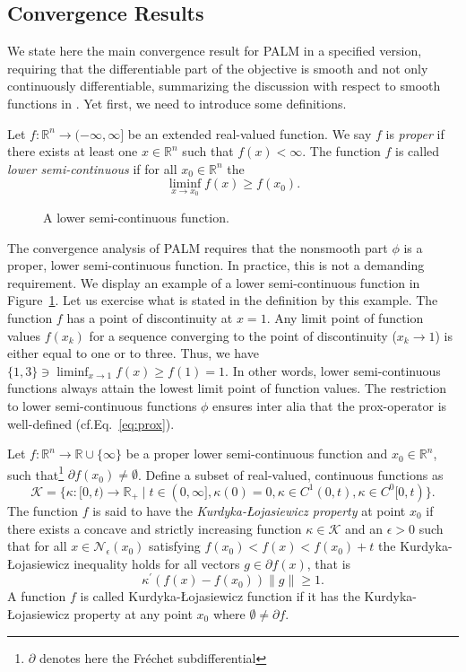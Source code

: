 \subsection{Convergence Results}
We state here the main convergence result for PALM in a specified version, requiring that the differentiable part of the objective is smooth and not only continuously differentiable, summarizing the discussion with respect to smooth functions in \citep{bolte2014proximal}. Yet first, we need to introduce some definitions.
\begin{definition} Let $f:\mathbb{R}^{n}\rightarrow (-\infty,\infty]$ be an extended real-valued function. We say $f$ is \emph{proper} if there exists at least one $x\in\mathbb{R}^n$ such that $f(x)<\infty$. The function $f$ is called \emph{lower semi-continuous} if for all $x_0\in\mathbb{R}^n$ the
\[\liminf_{x\rightarrow x_0}f(x)\geq f(x_0).\]
\end{definition}
\begin{figure}
\centering

\caption{A lower semi-continuous function.}
\label{fig:PT:lowerSemiCont}
\end{figure}
The convergence analysis of PALM requires that the nonsmooth part $\phi$ is a proper, lower semi-continuous function. In practice, this is not a demanding requirement.
We display an example of a lower semi-continuous function in Figure~\ref{fig:PT:lowerSemiCont}. Let us exercise what is stated in the definition by this example. The function $f$ has a point of discontinuity at $x=1$. Any limit point of function values $f(x_k)$ for a sequence converging to the point of discontinuity ($x_k\rightarrow 1$) is either equal to one or to three. Thus, we have $\{1,3\}\ni\liminf_{x\rightarrow 1}f(x)\geq f(1)=1$. In other words, lower semi-continuous functions always attain the lowest limit point of function values. The restriction to lower semi-continuous functions $\phi$ ensures inter alia that the prox-operator is well-defined (cf.\@ Eq.~\eqref{eq:prox}).
\begin{definition}
Let $f:\mathbb{R}^{n}\rightarrow \mathbb{R}\cup\{\infty\}$ be a proper lower semi-continuous function and $x_0\in\mathbb{R}^n$, such that\footnote{$\partial $ denotes here the Fr\'{e}chet subdifferential} $\partial f(x_0)\neq\emptyset$. Define a subset of real-valued, continuous functions as
\[\mathcal{K}=\{\kappa:[0,t)\rightarrow \mathbb{R}_+\mid t\in(0,\infty],\kappa(0)=0,\kappa\in C^1(0,t), \kappa\in C^0[0,t)\}.\] 
The function $f$ is said to have the \emph{Kurdyka-{\L}ojasiewicz property} at point $x_0$ if there exists a concave and strictly increasing function $\kappa\in\mathcal{K}$ and an $\epsilon>0$ such that for all 
$x\in \mathcal{N}_\epsilon(x_0)$ satisfying $f(x_0)<f(x)<f(x_0)+t$
the Kurdyka-{\L}ojasiewicz inequality holds for all vectors $g\in\partial f(x)$, that is
\[\kappa^\prime\left(f(x)-f(x_0)\right)\lVert g\rVert \geq 1.\]
A function $f$ is called Kurdyka-{\L}ojasiewicz function if it has the Kurdyka-{\L}ojasiewicz property at any point $x_0$ where $\emptyset \neq \partial f$. 
\end{definition}
